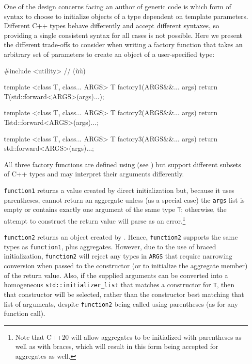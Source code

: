 One of the design concerns facing an author of generic code is which
form of syntax to choose to initialize objects of a type dependent on
template parameters. Different C++ types behave differently and accept
different syntaxes, so providing a single consistent syntax for all
cases is not possible. Here we present the different trade-offs to
consider when writing a factory function that takes an arbitrary set of
parameters to create an object of a user-specified type:

\begin{emcppslisting}
#include <utility>  // (ù{}ù)

template <class T, class... ARGS>
T factory1(ARGS&&... args)
{
    return T(std::forward<ARGS>(args)...);
}

template <class T, class... ARGS>
T factory2(ARGS&&... args)
{
    return T{std::forward<ARGS>(args)...};
}

template <class T, class... ARGS>
T factory3(ARGS&&... args)
{
    return {std::forward<ARGS>(args)...};
}
\end{emcppslisting}
    

\noindent All three factory functions are defined using  (see ) but support
different subsets of C++ types and may interpret their arguments
differently.

\lstinline!function1! returns a value created by direct initialization but,
because it uses parentheses, cannot return an aggregate unless (as a
special case) the \lstinline!args! list is empty or contains exactly one
argument of the same type \lstinline!T!; otherwise, the attempt to
construct the return value will parse as an error.{\cprotect\footnote{Note
that C++20 will allow aggregates to be initialized with parentheses as
well as with braces, which will result in this form being accepted for
  aggregates as well.}}

\lstinline!function2! returns an object created by . Hence, \lstinline!function2! supports the same types as
\lstinline!function1!, plus aggregates. However, due to the use of braced
initialization, \lstinline!function2! will reject any types in
\lstinline!ARGS! that require narrowing conversion when passed to the
constructor (or to initialize the aggregate member) of the return value.
Also, if the supplied arguments can be converted into a homogeneous
\lstinline!std::initializer_list! that matches a constructor for
\lstinline!T!, then that constructor will be selected, rather than the
constructor best matching that list of arguments, despite
\lstinline!function2! being called using parentheses (as for any function
call).


